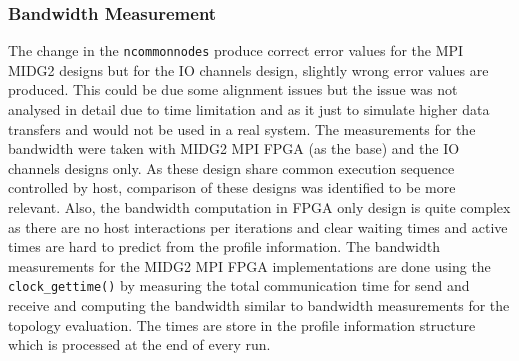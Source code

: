 \subsubsection{Bandwidth Measurement}
The change in the \texttt{ncommonnodes} produce correct error values for the MPI MIDG2 designs but
for the IO channels design, slightly wrong error values are produced. This could be due some alignment
issues but the issue was not analysed in detail due to time limitation and as it just to simulate
higher data transfers and would not be used in a real system. The measurements for the bandwidth
were taken with MIDG2 MPI FPGA (as the base) and the IO channels designs only. As these
design share common execution sequence controlled by host, comparison of these designs
was identified to be more relevant. Also, the bandwidth computation in FPGA only design
is quite complex as there are no host interactions per iterations and clear waiting times
and active times are hard to predict from the profile information.
The bandwidth measurements for the MIDG2 MPI FPGA implementations are done using the \texttt{clock\_gettime()}
by measuring the total communication time for send and receive and computing the bandwidth similar to
bandwidth measurements for the topology evaluation. The times are store in the profile information structure
which is processed at the end of every run.






